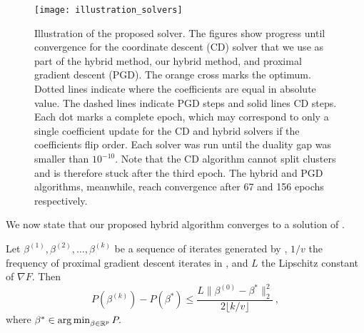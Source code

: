 \begin{figure*}[htb]
  \centering
  \texttt{[image: illustration\_solvers]}
  \caption{Illustration of the proposed solver. The figures show progress
    until convergence for the coordinate descent (CD) solver that we use as part
    of the hybrid method, our hybrid method, and  proximal gradient descent
    (PGD). The orange cross marks the optimum. Dotted lines indicate where the
    coefficients are equal in absolute value. The dashed lines indicate PGD
    steps and solid lines CD steps. Each dot marks a complete epoch, which may
    correspond to only a single coefficient update for the CD and hybrid
    solvers if the coefficients flip order. Each solver was run until the duality
    gap was smaller than \(10^{-10}\). Note that the CD algorithm cannot split clusters
    and is therefore stuck after the third epoch. The hybrid and PGD algorithms,
    meanwhile, reach convergence after 67 and 156 epochs respectively.}
  \label{fig:illustration-solver}
\end{figure*}

We now state that our proposed hybrid algorithm converges to a solution of .

\begin{lemma}
  \label{lem:convergence}
  Let \(\beta^{(1)}, \beta^{(2)}, \dots, \beta^{(k)}\) be a sequence of
  iterates generated by , \(1/v\) the frequency of proximal gradient
  descent iterates in , and \(L\) the Lipschitz constant of
  \(\nabla F\). Then
  \[
    P(\beta^{(k)}) - P(\beta^*) \leq \frac{L \lVert \beta^{(0)} - \beta^* \rVert_2^2}{2\lfloor k/v \rfloor }\, ,
  \]
  where \(\beta^* \in \operatorname*{arg\,min}_{\beta \in \mathbb{R}^p} P.\)
\end{lemma}
